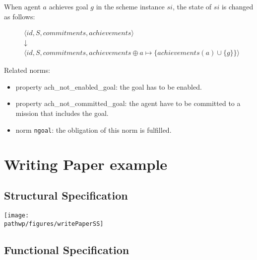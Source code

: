 \documentclass{article}
\newcommand{\code}[1]{\texttt{#1}}
\newcommand{\pathwp}{../../examples/writePaper}
\theoremstyle{definition} \newtheorem{definition}{Definition}
\begin{document}
When agent $a$ achieves goal $g$ in the scheme instance $si$, the
state of $si$ is changed as follows:

\begin{eqnarray*}
& \langle id, S, commitments, achievements \rangle \\
&  \downarrow \\
& \langle id, S, commitments, achievements  \oplus a \mapsto \{ achievements(a) \cup \{g\} \}\rangle
\end{eqnarray*}

Related norms:
\begin{itemize}
\item property ach\_not\_enabled\_goal: the goal has to be enabled.
\item property ach\_not\_committed\_goal: the agent have to be
  committed to a mission that includes the goal.
\item norm \code{ngoal}: the obligation of this norm is fulfilled.
\end{itemize}


\appendix

\section{Writing Paper example} \label{apx:wp}

\subsection{Structural Specification}

\begin{center}
  \texttt{[image: \\pathwp/figures/writePaperSS]}
\end{center}

\subsection{Functional Specification}
\end{document}
